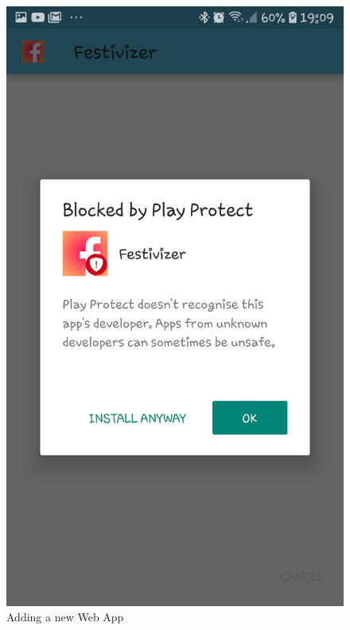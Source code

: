 				\begin{figure}[H]
					\includegraphics[width=\linewidth]{images/Android_3.jpg}
					\caption{Adding a new Web App}
					\label{fig:android_3}
				\end{figure}
			
			\eject 